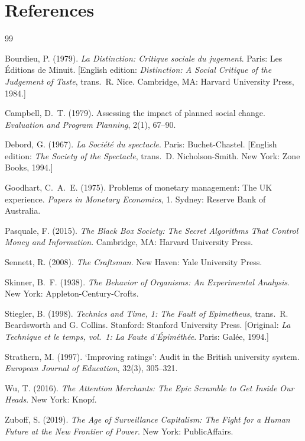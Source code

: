 \documentclass[12pt, a4paper]{article}
\begin{document}
\section*{References}

\begin{thebibliography}{99}
\setlength{\itemsep}{0.4em}

Bourdieu, P. (1979).
\textit{La Distinction: Critique sociale du jugement}.
Paris: Les \'{E}ditions de Minuit.
[English edition: \textit{Distinction: A Social Critique of the Judgement of Taste},
trans.\ R. Nice. Cambridge, MA: Harvard University Press, 1984.]

Campbell, D.~T. (1979).
Assessing the impact of planned social change.
\textit{Evaluation and Program Planning}, 2(1), 67--90.

Debord, G. (1967).
\textit{La Soci\'{e}t\'{e} du spectacle}.
Paris: Buchet-Chastel.
[English edition: \textit{The Society of the Spectacle},
trans.\ D. Nicholson-Smith. New York: Zone Books, 1994.]

Goodhart, C.~A.~E. (1975).
Problems of monetary management: The UK experience.
\textit{Papers in Monetary Economics}, 1.
Sydney: Reserve Bank of Australia.

Pasquale, F. (2015).
\textit{The Black Box Society: The Secret Algorithms That Control Money and Information}.
Cambridge, MA: Harvard University Press.

Sennett, R. (2008).
\textit{The Craftsman}.
New Haven: Yale University Press.

Skinner, B.~F. (1938).
\textit{The Behavior of Organisms: An Experimental Analysis}.
New York: Appleton-Century-Crofts.

Stiegler, B. (1998).
\textit{Technics and Time, 1: The Fault of Epimetheus},
trans.\ R. Beardsworth and G. Collins.
Stanford: Stanford University Press.
[Original: \textit{La Technique et le temps, vol.\ 1: La Faute d'\'{E}pim\'{e}th\'{e}e}.
Paris: Gal\'{e}e, 1994.]

Strathern, M. (1997).
`Improving ratings': Audit in the British university system.
\textit{European Journal of Education}, 32(3), 305--321.

Wu, T. (2016).
\textit{The Attention Merchants: The Epic Scramble to Get Inside Our Heads}.
New York: Knopf.

Zuboff, S. (2019).
\textit{The Age of Surveillance Capitalism: The Fight for a Human Future at the New Frontier of Power}.
New York: PublicAffairs.

\end{thebibliography}
\end{document}
